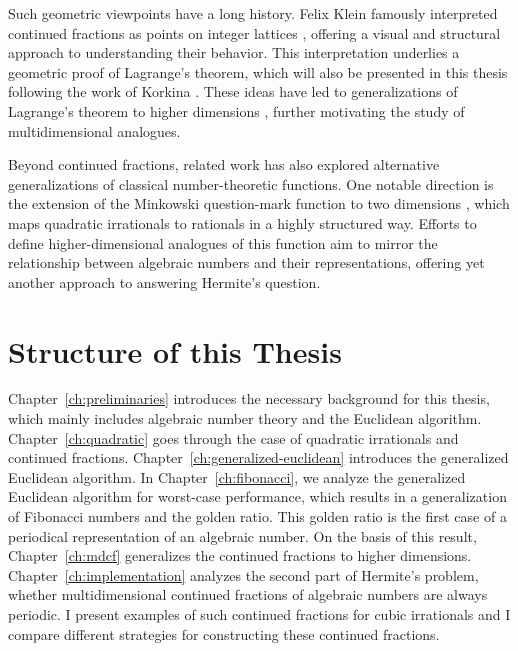 Such geometric viewpoints have a long history. Felix Klein famously interpreted
continued fractions as points on integer lattices \cite{Klein95}, offering
a visual and structural approach to understanding their behavior.
This interpretation underlies a geometric proof of Lagrange’s theorem, which will
also be presented in this thesis following the work of Korkina \cite{Korkina96}.
These ideas have led to generalizations of Lagrange’s theorem
to higher dimensions \cite{German08}, further motivating the study of
multidimensional analogues.

Beyond continued fractions, related work has also explored alternative
generalizations of classical number-theoretic functions.
One notable direction is the extension of the Minkowski question-mark function
to two dimensions \cite{Beaver04}, which maps quadratic irrationals to rationals in a highly structured way.
Efforts to define higher-dimensional analogues of this function aim to mirror
the relationship between algebraic numbers and their representations,
offering yet another approach to answering Hermite’s question.

\section{Structure of this Thesis}

Chapter~\ref{ch:preliminaries} introduces the necessary background for this thesis,
which mainly includes algebraic number theory and the Euclidean algorithm.
Chapter~\ref{ch:quadratic} goes through the case of quadratic irrationals
and continued fractions.
Chapter~\ref{ch:generalized-euclidean} introduces the generalized Euclidean algorithm.
In Chapter~\ref{ch:fibonacci}, we analyze the generalized Euclidean algorithm for worst-case performance,
which results in a generalization of Fibonacci numbers and the golden ratio.
This golden ratio is the first case of a periodical representation of an algebraic number.
On the basis of this result, Chapter~\ref{ch:mdcf} generalizes the continued fractions to higher dimensions.
Chapter~\ref{ch:implementation} analyzes the second part of Hermite's problem,
whether multidimensional continued fractions of algebraic numbers are always periodic.
I present examples of such continued fractions for cubic irrationals and I
compare different strategies for constructing these continued fractions.
